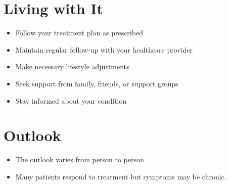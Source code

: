 \section{Living with It}
\begin{itemize}[noitemsep]
  \item Follow your treatment plan as prescribed
  \item Maintain regular follow-up with your healthcare provider
  \item Make necessary lifestyle adjustments
  \item Seek support from family, friends, or support groups
  \item Stay informed about your condition
\end{itemize}
\section{Outlook}
\begin{itemize}[noitemsep]
  \item The outlook varies from person to person
  \item Many patients respond to treatment but symptoms may be chronic.
\end{itemize}
